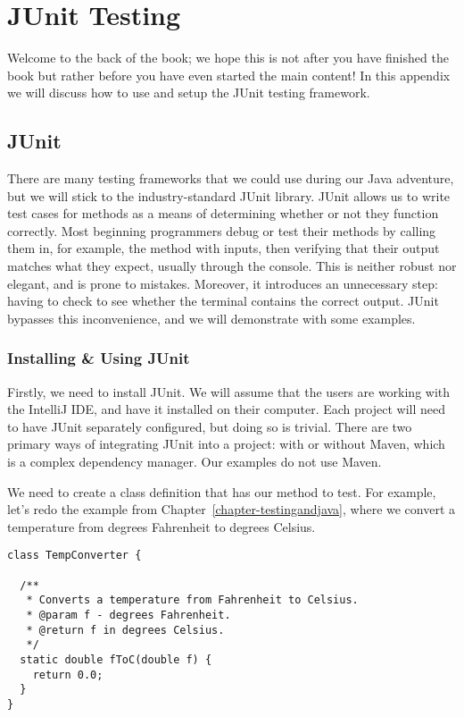 \appendix
\chapter{JUnit Testing}
\label{appendix-junit} %

Welcome to the back of the book; we hope this is not after you have finished the book but rather before you have even started the main content! In this appendix we will discuss how to use and setup the JUnit testing framework.

\section{JUnit}

There are many testing frameworks that we could use during our Java adventure, but we will stick to the industry-standard JUnit library. JUnit allows us to write test cases for methods as a means of determining whether or not they function correctly. Most beginning programmers debug or test their methods by calling them in, for example, the  method with inputs, then verifying that their output matches what they expect, usually through the console. This is neither robust nor elegant, and is prone to mistakes. Moreover, it introduces an unnecessary step: having to check to see whether the terminal contains the correct output. JUnit bypasses this inconvenience, and we will demonstrate with some examples.

\subsection{Installing \& Using JUnit}

Firstly, we need to install JUnit. We will assume that the users are working with the IntelliJ IDE, and have it installed on their computer. Each project will need to have JUnit separately configured, but doing so is trivial. There are two primary ways of integrating JUnit into a project: with or without Maven, which is a complex dependency manager. Our examples do not use Maven.

We need to create a class definition that has our method to test. For example, let's redo the example from Chapter~\ref{chapter-testingandjava}, where we convert a temperature from degrees Fahrenheit to degrees Celsius.

\begin{lstlisting}[language=MyJava]
class TempConverter {

  /**
   * Converts a temperature from Fahrenheit to Celsius.
   * @param f - degrees Fahrenheit.
   * @return f in degrees Celsius.
   */
  static double fToC(double f) {
    return 0.0;
  }
}
\end{lstlisting}

